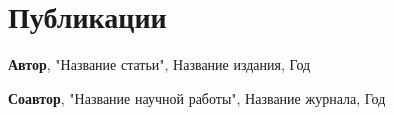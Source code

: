 \section{Публикации}

\begin{cvitems}
  \item {\textbf{Автор}, "Название статьи", Название издания, Год}
  \item {\textbf{Соавтор}, "Название научной работы", Название журнала, Год}
\end{cvitems}